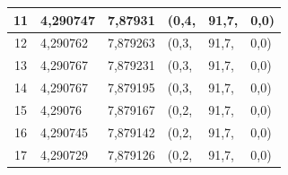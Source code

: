 \begin{table}[!htb]
\begin{tabular}{|c|l|l|l|l|l|}
11                             & {\color[HTML]{000000} 4,290747}                                                                             & {\color[HTML]{000000} 7,87931}                                                                               & {\color[HTML]{000000} (0,4,}    & {\color[HTML]{000000} 91,7,}    & {\color[HTML]{000000} 0,0)}     \\ \hline
12                             & {\color[HTML]{000000} 4,290762}                                                                             & {\color[HTML]{000000} 7,879263}                                                                              & {\color[HTML]{000000} (0,3,}    & {\color[HTML]{000000} 91,7,}    & {\color[HTML]{000000} 0,0)}     \\ \hline
13                             & {\color[HTML]{000000} 4,290767}                                                                             & {\color[HTML]{000000} 7,879231}                                                                              & {\color[HTML]{000000} (0,3,}    & {\color[HTML]{000000} 91,7,}    & {\color[HTML]{000000} 0,0)}     \\ \hline
14                             & {\color[HTML]{000000} 4,290767}                                                                             & {\color[HTML]{000000} 7,879195}                                                                              & {\color[HTML]{000000} (0,3,}    & {\color[HTML]{000000} 91,7,}    & {\color[HTML]{000000} 0,0)}     \\ \hline
15                             & {\color[HTML]{000000} 4,29076}                                                                              & {\color[HTML]{000000} 7,879167}                                                                              & {\color[HTML]{000000} (0,2,}    & {\color[HTML]{000000} 91,7,}    & {\color[HTML]{000000} 0,0)}     \\ \hline
16                             & {\color[HTML]{000000} 4,290745}                                                                             & {\color[HTML]{000000} 7,879142}                                                                              & {\color[HTML]{000000} (0,2,}    & {\color[HTML]{000000} 91,7,}    & {\color[HTML]{000000} 0,0)}     \\ \hline
17                             & {\color[HTML]{000000} 4,290729}                                                                             & {\color[HTML]{000000} 7,879126}                                                                              & {\color[HTML]{000000} (0,2,}    & {\color[HTML]{000000} 91,7,}    & {\color[HTML]{000000} 0,0)}     \\ \hline

\end{tabular}
\end{table}
